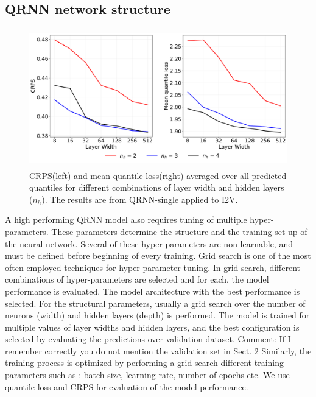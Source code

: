 \documentclass[amt, manuscript]{copernicus}
\newcommand{\todo}[1]{{\color{red} #1}}
\begin{document}
\subsection{QRNN network structure}
\label{appendix:hyperparamter}
%
\begin{figure}[t]
	\centering
	\includegraphics[height=60mm]{Figures/CRPS.pdf} 
	\caption{CRPS(left) and mean quantile loss(right) averaged over all predicted quantiles for different combinations of layer width and hidden layers ($n_h$). The results are from QRNN-single applied to I2V.}
	\label{fig:grid_search}	
\end{figure}
A high performing QRNN model also requires tuning of multiple hyper-parameters. These parameters determine the structure and the training set-up of the neural network. Several of these hyper-parameters are non-learnable, and must be defined before beginning of every training. Grid search is one of the most often employed techniques for hyper-parameter tuning. In grid search, different combinations of hyper-parameters are selected and for each, the model performance is evaluated. The model architecture with the best performance is selected. For the structural parameters, usually a grid search over the number of neurons (width) and hidden layers (depth) is performed. The model is trained for multiple values of layer widths and hidden layers, and the best configuration is selected by evaluating the predictions over validation dataset. \todo{Comment: If I remember correctly you do not mention the validation set in Sect. 2} Similarly, the training process is optimized by performing a grid search different training parameters such as : batch size, learning rate, number of epochs etc. We use quantile loss and CRPS for evaluation of the model performance.
\end{document}
